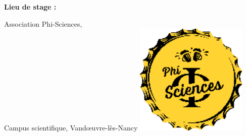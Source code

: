 \begin{titlepage}
\begin{center}
           
        \Large
        \begin{minipage}[t]{0.4\textwidth}
             \textbf{Lieu de stage :}
        \end{minipage}
        \hfill
        \begin{minipage}[t]{0.45\textwidth}
            \raggedleft
            Association Phi-Sciences,\\
            Campus scientifique, Vandœuvre-lès-Nancy
            \includegraphics[width=0.40\textwidth]{phi.png}
        \end{minipage}
        
        
            
    \end{center}
\end{titlepage}


